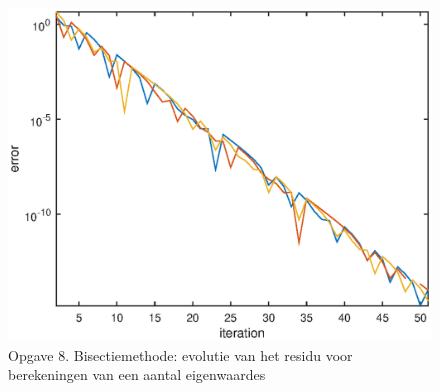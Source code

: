 \documentclass[]{article}
\begin{document}
\begin{figure}
\begin{center}
\includegraphics[width=1\textwidth]{opgave8.eps}
\end{center}
\caption{Opgave 8. Bisectiemethode: evolutie van het residu voor berekeningen van een aantal eigenwaardes}
\label{opgave8}
\end{figure}
\end{document}
